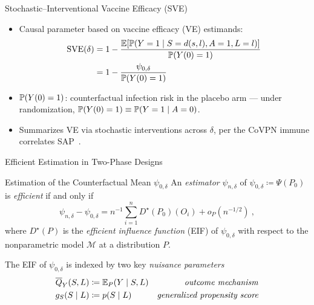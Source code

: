 \documentclass{beamer}
\begin{document}
\begin{frame}[c]{Stochastic--Interventional Vaccine Efficacy (SVE)}

\begin{center}
\begin{itemize}
  \itemsep8pt
  \item Causal parameter based on vaccine efficacy (VE) estimands:
  \begin{align*}
    \text{SVE}(\delta) &= 1 - \frac{\mathbb{E}[\mathbb{P}(Y = 1 \mid S = d(s, l), A = 1,
                                    L = l)]}{\mathbb{P}(Y(0)=1)} \\
                       &= 1 - \frac{\psi_{0, \delta}}{\mathbb{P}(Y(0)=1)}
  \end{align*}
  \item $\mathbb{P}(Y(0)=1)$: counterfactual infection risk in the placebo arm ---
    under randomization, $\mathbb{P}(Y(0)=1) \equiv \mathbb{P}(Y=1 \mid A=0)$.
  \item Summarizes VE via stochastic interventions across $\delta$, per the
    CoVPN immune correlates SAP\footnotemark~\citep{gilbert2021covpn,
    gilbert2021immune}.
\end{itemize}
\end{center}

\note{
}


\end{frame}


\begin{frame}[standout]
  Efficient Estimation in Two-Phase Designs
\end{frame}


\begin{frame}{Estimation of the Counterfactual Mean $\psi_{0,\delta}$}
An \textit{estimator} $\psi_{n,\delta}$ of $\psi_{0,\delta} \coloneqq \Psi(P_0)$
is \textit{efficient} if and only if
\[
  \psi_{n,\delta} - \psi_{0, \delta} = n^{-1} \sum\limits_{i=1}^n
  D^{\star}(P_0)(O_i) + o_P(n^{-1/2}) \ ,
\]
where $D^{\star}(P)$ is the \textit{efficient influence function} (EIF) of
$\psi_{0,\delta}$ with respect to the nonparametric model $\mathcal{M}$ at a
distribution $P$.
\vspace{0.25cm}

The EIF of $\psi_{0,\delta}$ is indexed by two key \textit{nuisance parameters}
\begin{align*}
  \overline{Q}_{Y}(S,L) &\coloneqq \mathbb{E}_{P}(Y \mid S, L) &
      \mbox{\textit{outcome mechanism}} \\
  g_{S}(S \mid L) &\coloneqq p(S \mid L) &
    \mbox{\textit{generalized propensity score}}
\end{align*}

\note{
}

\end{frame}
\end{document}
